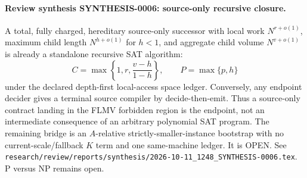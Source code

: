 \paragraph{Review synthesis SYNTHESIS-0006: source-only recursive closure.}
A total, fully charged, hereditary source-only successor with local work
$N^{r+o(1)}$, maximum child length $N^{h+o(1)}$ for $h<1$, and aggregate
child volume $N^{v+o(1)}$ is already a standalone recursive SAT algorithm:
\[
 C=\max\left\{1,r,\frac{v-h}{1-h}\right\},\qquad
 P=\max\{p,h\}
\]
under the declared depth-first local-access space ledger.  Conversely, any
endpoint decider gives a terminal source compiler by decide-then-emit.  Thus
a source-only contract landing in the FLMV forbidden region is the endpoint,
not an intermediate consequence of an arbitrary polynomial SAT program.
The remaining bridge is an $A$-relative strictly-smaller-instance bootstrap
with no current-scale/fallback $K$ term and one same-machine ledger.  It is
OPEN.  See
\texttt{research/review/reports/synthesis/2026-10-11\_1248\_SYNTHESIS-0006.tex}.
P versus NP remains open.
